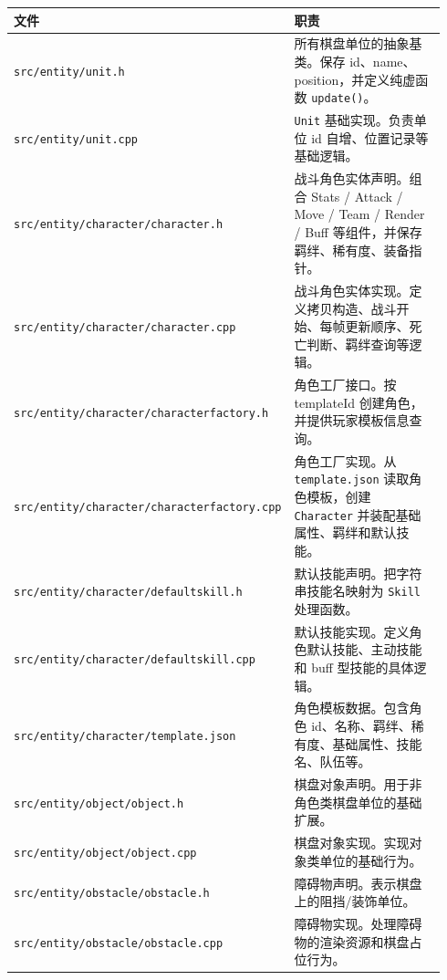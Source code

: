 \documentclass[UTF8,10pt]{ctexart}
\begin{document}
{\small
\begin{longtable}{p{0.34\linewidth}p{0.60\linewidth}}
\toprule
\textbf{文件} & \textbf{职责} \\
\midrule
\texttt{src/\allowbreak{}entity/\allowbreak{}unit.\allowbreak{}h} & 所有棋盘单位的抽象基类。保存 id、name、position，并定义纯虚函数 \texttt{update()}。 \\
\texttt{src/\allowbreak{}entity/\allowbreak{}unit.\allowbreak{}cpp} & \texttt{Unit} 基础实现。负责单位 id 自增、位置记录等基础逻辑。 \\
\texttt{src/\allowbreak{}entity/\allowbreak{}character/\allowbreak{}character.\allowbreak{}h} & 战斗角色实体声明。组合 Stats / Attack / Move / Team / Render / Buff 等组件，并保存羁绊、稀有度、装备指针。 \\
\texttt{src/\allowbreak{}entity/\allowbreak{}character/\allowbreak{}character.\allowbreak{}cpp} & 战斗角色实体实现。定义拷贝构造、战斗开始、每帧更新顺序、死亡判断、羁绊查询等逻辑。 \\
\texttt{src/\allowbreak{}entity/\allowbreak{}character/\allowbreak{}characterfactory.\allowbreak{}h} & 角色工厂接口。按 templateId 创建角色，并提供玩家模板信息查询。 \\
\texttt{src/\allowbreak{}entity/\allowbreak{}character/\allowbreak{}characterfactory.\allowbreak{}cpp} & 角色工厂实现。从 \texttt{template.\allowbreak{}json} 读取角色模板，创建 \texttt{Character} 并装配基础属性、羁绊和默认技能。 \\
\texttt{src/\allowbreak{}entity/\allowbreak{}character/\allowbreak{}defaultskill.\allowbreak{}h} & 默认技能声明。把字符串技能名映射为 \texttt{Skill} 处理函数。 \\
\texttt{src/\allowbreak{}entity/\allowbreak{}character/\allowbreak{}defaultskill.\allowbreak{}cpp} & 默认技能实现。定义角色默认技能、主动技能和 buff 型技能的具体逻辑。 \\
\texttt{src/\allowbreak{}entity/\allowbreak{}character/\allowbreak{}template.\allowbreak{}json} & 角色模板数据。包含角色 id、名称、羁绊、稀有度、基础属性、技能名、队伍等。 \\
\texttt{src/\allowbreak{}entity/\allowbreak{}object/\allowbreak{}object.\allowbreak{}h} & 棋盘对象声明。用于非角色类棋盘单位的基础扩展。 \\
\texttt{src/\allowbreak{}entity/\allowbreak{}object/\allowbreak{}object.\allowbreak{}cpp} & 棋盘对象实现。实现对象类单位的基础行为。 \\
\texttt{src/\allowbreak{}entity/\allowbreak{}obstacle/\allowbreak{}obstacle.\allowbreak{}h} & 障碍物声明。表示棋盘上的阻挡/装饰单位。 \\
\texttt{src/\allowbreak{}entity/\allowbreak{}obstacle/\allowbreak{}obstacle.\allowbreak{}cpp} & 障碍物实现。处理障碍物的渲染资源和棋盘占位行为。 \\
\bottomrule
\end{longtable}
}
\end{document}
